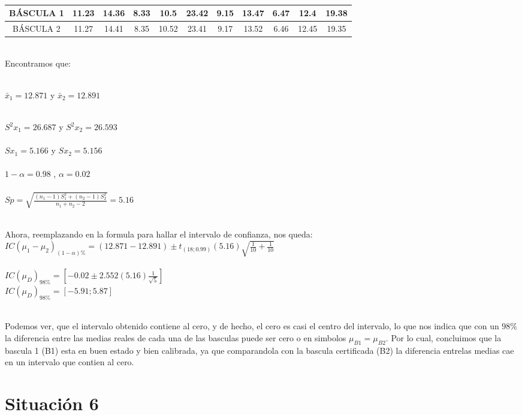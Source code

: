 \documentclass[letterpaper,12pt,onecolumn,titlepage]{article}
\begin{document}
~\\ \begin{center}
 \begin{tabular}{|c|c|c|c|c|c|c|c|c|c|c|}
\hline 
\rule[-1ex]{0pt}{2.5ex} B\'{A}SCULA 1 & 11.23 & 14.36 & 8.33 & 10.5 & 23.42 & 9.15 & 13.47 & 6.47 & 12.4 & 19.38 \\ 
\hline 
\rule[-1ex]{0pt}{2.5ex} B\'{A}SCULA 2 & 11.27 & 14.41 & 8.35 & 10.52 & 23.41 & 9.17 & 13.52 & 6.46 & 12.45 & 19.35 \\ 
\hline 

\end{tabular} 
\end{center}

~\\ Encontramos que: 

~\\$\bar{x}_{1}=12.871$ y $\bar{x}_{2}=12.891$

~\\$S^2{x}_{1}=26.687$ y $S^2{x}_{2}=26.593$\\
~\\$S{x}_{1}=5.166$ y $S{x}_{2}=5.156$\\
~\\ $1-\alpha=0.98$ ,  $\alpha= 0.02$\\
~\\ $Sp=\sqrt{\frac{(n_{1}-1)S_{1}^2+(n_{2}-1)S_{2}^2}{n_{1}+n_{2}-2}}= 5.16$

~\\ Ahora, reemplazando en la formula para hallar el intervalo de confianza, nos queda:
~\\ $IC(\mu_{1}-\mu_{2} )_{(1-\alpha)\%}=( 12.871 - 12.891) \pm t_{(18 ;0.99)}(5.16)\sqrt{\frac{1}{10}+\frac{1}{10}}$ \\
~\\ $IC(\mu_{D})_{98\%}=[-0.02 \pm 2.552 (5.16) \frac{1}{\sqrt{5}}]$
~\\ $IC(\mu_{D})_{98\%}=[-5.91 ; 5.87 ]$

~\\ Podemos ver, que el intervalo obtenido contiene al cero, y de hecho, el cero es casi el centro del intervalo, lo que nos indica que con un $98\%$ la diferencia entre las medias reales de cada una de las basculas puede ser cero o en simbolos $\mu_{B1}=\mu_{B2}$. Por lo cual, concluimos que la bascula 1 (B1) esta en buen estado y bien calibrada, ya que comparandola con la bascula certificada (B2) la diferencia entrelas medias cae en un intervalo que contien al cero.   


\pagebreak\section{Situaci\'{o}n 6}
\end{document}
